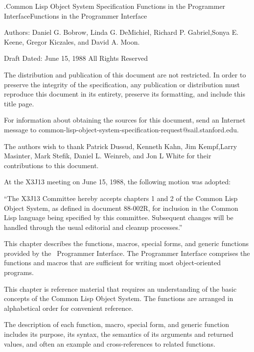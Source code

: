 
\drafttrue
\def\bookline{\CLOS\  Specification}
\def\chapline{Functions in the Programmer Interface}

.{Common Lisp Object System Specification}%
{Functions in the Programmer Interface}{Functions in the Programmer Interface}

Authors: Daniel G. Bobrow, Linda G. DeMichiel, Richard P.
Gabriel,\hfil\break Sonya E. Keene, Gregor Kiczales, and David A.
Moon.

Draft Dated: June 15, 1988\hfil\break
All Rights Reserved

The distribution and publication of this document are not restricted.
In order to preserve the integrity of the specification, any
publication or distribution must reproduce this document in its
entirety, preserve its formatting, and include this title page.

For information about obtaining the sources for this document, send
an Internet message to 
common-lisp-object-system-specification-request@sail.stanford.edu.

The authors wish to thank Patrick Dussud, Kenneth Kahn,
Jim Kempf,\hfil\break Larry Masinter, Mark Stefik,
Daniel L. Weinreb, and Jon L White\hfil\break
for their contributions to this document.

\vskip 2pc
At the X3J13 meeting on June 15, 1988, the following motion was
adopted:

``The X3J13 Committee hereby accepts chapters 1 and 2
of the Common Lisp Object System, as defined in document
88-002R, for inclusion in the Common Lisp language being
specified by this committee. Subsequent changes will be handled
through the usual editorial and cleanup processes.''

\endTitlePage


This chapter describes the functions, macros, special forms, and
generic functions provided by the \CLOS\ Programmer Interface.  The
Programmer Interface comprises the functions and macros that are
sufficient for writing most object-oriented programs.

This chapter is reference material that requires an understanding of
the basic concepts of the Common Lisp Object System.  The functions
are arranged in alphabetical order for convenient reference.

The description of each function, macro, special form,
and generic function includes its purpose, its syntax, the
semantics of its arguments and returned values, and often an example
and cross-references to related functions.

